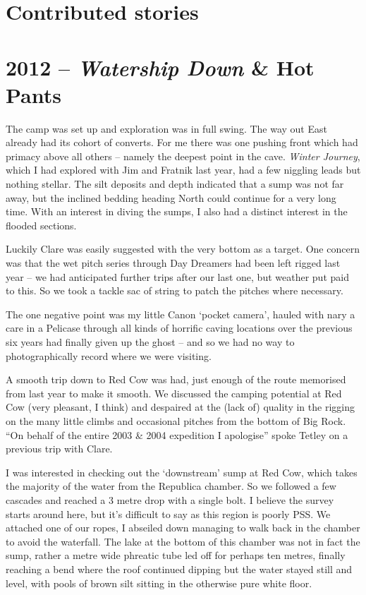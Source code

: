 \hypertarget{contributed-stories-1}{%
\section{Contributed stories}\label{contributed-stories-1}}

\hypertarget{watership-down-hot-pants}{%
\section{\texorpdfstring{2012 -- \emph{Watership Down} \& Hot
Pants}{2012 -- Watership Down \& Hot Pants}}\label{watership-down-hot-pants}}

The camp was set up and exploration was in full swing. The way out East
already had its cohort of converts. For me there was one pushing front
which had primacy above all others -- namely the deepest point in the
cave. \emph{Winter Journey}, which I had explored with Jim and Fratnik
last year, had a few niggling leads but nothing stellar. The silt
deposits and depth indicated that a sump was not far away, but the
inclined bedding heading North could continue for a very long time. With
an interest in diving the sumps, I also had a distinct interest in the
flooded sections.

Luckily Clare was easily suggested with the very bottom as a target. One
concern was that the wet pitch series through Day Dreamers had been left
rigged last year -- we had anticipated further trips after our last one,
but weather put paid to this. So we took a tackle sac of string to patch
the pitches where necessary.

The one negative point was my little Canon `pocket camera', hauled with
nary a care in a Pelicase through all kinds of horrific caving locations
over the previous six years had finally given up the ghost -- and so we
had no way to photographically record where we were visiting.

A smooth trip down to Red Cow was had, just enough of the route
memorised from last year to make it smooth. We discussed the camping
potential at Red Cow (very pleasant, I think) and despaired at the (lack
of) quality in the rigging on the many little climbs and occasional
pitches from the bottom of Big Rock. ``On behalf of the entire 2003 \&
2004 expedition I apologise'' spoke Tetley on a previous trip with
Clare.

I was interested in checking out the `downstream' sump at Red Cow, which
takes the majority of the water from the Republica chamber. So we
followed a few cascades and reached a 3 metre drop with a single bolt. I
believe the survey starts around here, but it's difficult to say as this
region is poorly PSS. We attached one of our ropes, I abseiled down
managing to walk back in the chamber to avoid the waterfall. The lake at
the bottom of this chamber was not in fact the sump, rather a metre wide
phreatic tube led off for perhaps ten metres, finally reaching a bend
where the roof continued dipping but the water stayed still and level,
with pools of brown silt sitting in the otherwise pure white floor.

